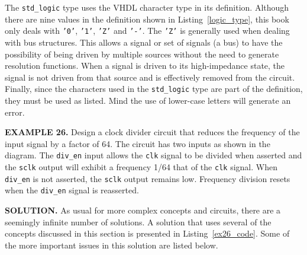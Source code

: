 The \texttt{std\_logic} type uses the VHDL character type in its definition. Although there are nine values in the definition shown in Listing~\ref{logic_type}, this book only deals with \texttt{'0'},  \texttt{'1'},  \texttt{'Z'} and  \texttt{'-'}. The  \texttt{'Z'} is generally used when dealing with bus structures. This allows a signal or set of signals (a bus) to have the possibility of being driven by multiple sources without the need to generate resolution functions. When a signal is driven to its high-impedance state, the signal is not driven from that source and is effectively removed from the circuit. Finally, since the characters used in the \texttt{std\_logic} type are part of the definition, they must be used as listed. Mind the use of lower-case letters will generate an error.
\begin{leftbar}
\begin{minipage}[t]{0.52\textwidth}
\vspace{10pt}
\noindent
\textbf{EXAMPLE 26.}
Design a clock divider circuit that reduces the frequency of the input signal by a factor of 64. The circuit has two inputs as shown in the diagram. The  \texttt{div\_en} input allows the  \texttt{clk} signal to be divided when asserted and the  \texttt{sclk} output will exhibit a frequency 1/64 that of the  \texttt{clk} signal. When  \texttt{div\_en} is not asserted, the  \texttt{sclk} output remains low. Frequency division resets when the  \texttt{div\_en} signal is reasserted.
\end{minipage}
\begin{minipage}[t]{0.45\linewidth}
\vspace{10pt}
\begin{flushright}
\end{flushright}
\end{minipage}
\end{leftbar}
\noindent
\textbf{SOLUTION.} As usual for more complex concepts and circuits, there are a seemingly infinite number of solutions. A solution that uses several of the concepts discussed in this section is presented in Listing~\ref{ex26_code}. Some of the more important issues in this solution are listed below.


